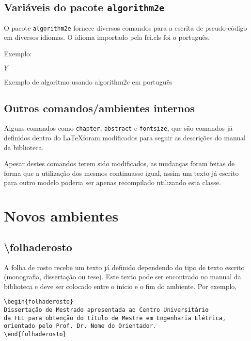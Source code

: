 \documentclass{fei}
\begin{document}
    \subsection{Variáveis do pacote \texttt{algorithm2e}}
    
    O pacote \verb+algorithm2e+ fornece diversos comandos para a escrita de pseudo-código em diversos idiomas. O idioma importado pela fei.cls foi o português.
    
    Exemplo:
    
\begin{algorithm}


\Retorna \(Y\)

\caption{Exemplo de algoritmo usando algorithm2e em português}
\label{lst:alg}
\end{algorithm}
    
    \subsection{Outros comandos/ambientes internos}
    
    Alguns comandos como \verb+chapter+, \verb+abstract+ e \verb+fontsize+, que são comandos já definidos dentro do \LaTeX foram modificados para seguir as descrições do manual da biblioteca.

    Apesar destes comandos terem sido modificados, as mudanças foram feitas de forma que a utilização dos mesmos continuasse igual, assim um texto já escrito para outro modelo poderia ser apenas recompilado utilizando esta classe.

\section{Novos ambientes}

    \subsection{\textbackslash folhaderosto}
    A folha de rosto recebe um texto já definido dependendo do tipo de texto escrito (monografia, dissertação ou tese). Este texto pode ser encontrado no manual da biblioteca e deve ser colocado entre o início e o fim do ambiente. Por exemplo,
    \begin{verbatim}
\begin{folhaderosto}
Dissertação de Mestrado apresentada ao Centro Universitário
da FEI para obtenção do título de Mestre em Engenharia Elétrica, 
orientado pelo Prof. Dr. Nome do Orientador. 
\end{folhaderosto}
    \end{verbatim}
\end{document}
